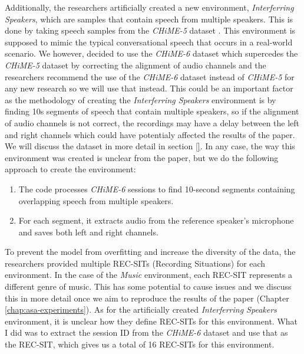 \documentclass[logo,bsc,singlespacing,parskip,online]{infthesis}
\newcommand{\chime}[1]{\textit{CHiME-#1}\xspace}
\begin{document}
Additionally, the researchers artificially created a new environment, \textit{Interferring Speakers}, which are samples that contain speech from multiple speakers. 
This is done by taking speech samples from the 
\chime{5} dataset \cite{barker18_fifth_2018}. This environment is supposed to mimic the 
typical conversational speech that occurs in a real-world scenario. We however, decided to use the \chime{6} dataset which 
supercedes the \chime{5} dataset \cite{barker18_fifth_2018} by correcting the alignment of audio channels and the researchers 
recommend the use of the \chime{6} dataset instead of \chime{5} for any new research so we will use that instead. This could 
be an important factor as the methodology of creating the \textit{Interferring Speakers} environment is by finding 10s 
segments of speech that contain multiple speakers, so if the alignment of audio channels is not correct, the recordings 
may have a delay between the left and right channels which could have potentialy affected the results of the paper. We will discuss the dataset in more detail in section \ref{}.
In any case, the way this environment was created is unclear from the paper, but we do the following approach to create the environment:
\begin{enumerate}
   \item The code processes \chime{6} sessions to find 10-second segments containing overlapping speech from multiple speakers.
   \item For each segment, it extracts audio from the reference speaker's microphone and saves both left and right channels.
\end{enumerate}

To prevent the model from overfitting and increase the diversity of the data, the researchers provided multiple REC-SITs (Recording Situations) for each environment.
In the case of the \textit{Music} environment, each REC-SIT represents a different genre of music. This has some potential to cause issues 
and we discuss this in more detail once we aim to reproduce the results of the paper (Chapter \ref{chap:asa-experiments}).  %
As for the artificially created \textit{Interferring Speakers} environment, it is unclear how they define REC-SITs for this environment. 
What I did was to extract the session ID from the \chime{6} dataset and use that as the REC-SIT, which 
gives us a total of 16 REC-SITs for this environment.
\end{document}
